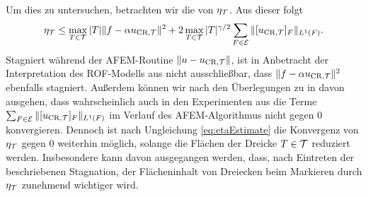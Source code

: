 Um dies zu untersuchen, betrachten wir die  von
$\eta_{\mathcal{T}}$.
Aus dieser folgt
\begin{align}
  \label{eq:etaEstimate}
  \eta_{\mathcal{T}} 
  \leq
  \max_{T\in\mathcal{T}}|T|\Vert f-\alpha u_{\textup{CR}, \mathcal{T}}\Vert^2
  + 2\max_{T\in\mathcal{T}}|T|^{\gamma/2}\sum_{F\in\mathcal{E}}\Vert[u_{\textup{CR}, \mathcal{T}}]_F\Vert_{L^1(F)}.
\end{align}
Stagniert während der AFEM-Routine $\Vert u-u_{\textup{CR}, \mathcal{T}}\Vert$, ist in Anbetracht
der Interpretation des ROF-Modells aus  nicht
ausschließbar, dass $\Vert f-\alpha u_{\textup{CR}, \mathcal{T}}\Vert^2$ ebenfalls stagniert.
Außerdem können wir nach den Überlegungen zu  in
 davon ausgehen,
dass wahrscheinlich auch in den Experimenten aus
 die Terme
$\sum_{F\in\mathcal{E}}\Vert[u_{\textup{CR}, \mathcal{T}}]_F\Vert_{L^1(F)}$ im Verlauf des AFEM-Algorithmus
nicht gegen $0$ konvergieren.
Dennoch ist nach Ungleichung \eqref{eq:etaEstimate} die Konvergenz von $\eta_{\mathcal{T}}$
gegen $0$ weiterhin möglich, solange die Flächen der Dreicke $T\in\mathcal{T}$
reduziert werden.  
Insbesondere kann davon ausgegangen werden, dass, nach Eintreten der 
beschriebenen Stagnation, der Flächeninhalt von Dreiecken beim Markieren durch 
$\eta_{\mathcal{T}}$ zunehmend wichtiger wird.
